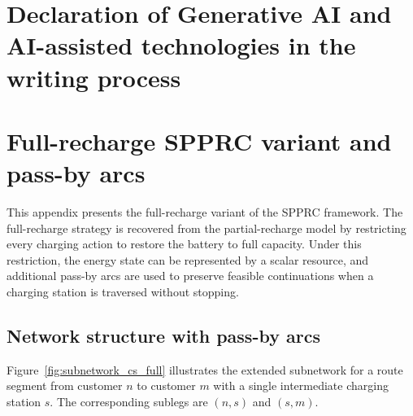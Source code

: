 \documentclass[3p,11pt,authoryear]{elsarticle}  %
\begin{document}

\section*{Declaration of Generative AI and AI-assisted technologies in the writing process}






\appendix
\newpage





\section{Full-recharge SPPRC variant and pass-by arcs}
\label{app:full_recharge_spprc}



This appendix presents the full-recharge variant of the SPPRC framework. The full-recharge strategy is recovered from the partial-recharge model by restricting every charging action to restore the battery to full capacity. Under this restriction, the energy state can be represented by a scalar resource, and additional pass-by arcs are used to preserve feasible continuations when a charging station is traversed without stopping.


\subsection{Network structure with pass-by arcs}


Figure~\ref{fig:subnetwork_cs_full} illustrates the extended subnetwork for a route segment from customer \(n\) to customer \(m\) with a single intermediate charging station \(s\). The corresponding sublegs are \((n,s)\) and \((s,m)\).
\end{document}
